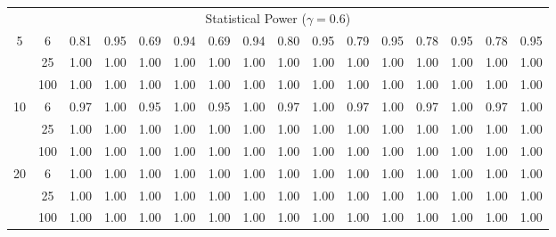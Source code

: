 \documentclass[
  man]{apa6}
\newenvironment{lltable}{\begin{landscape}\centering\begin{ThreePartTable}}{\end{ThreePartTable}\end{landscape}}
\begin{document}
\begin{lltable}
{\begin{longtable}{cccccccccccccccc}
\multicolumn{16}{c}{Statistical Power ($\gamma = 0.6$)}\\
5 & 6 & 0.81 & 0.95 & 0.69 & 0.94 & 0.69 & 0.94 & 0.80 & 0.95 & 0.79 & 0.95 & 0.78 & 0.95 & 0.78 & 0.95\\
 & 25 & 1.00 & 1.00 & 1.00 & 1.00 & 1.00 & 1.00 & 1.00 & 1.00 & 1.00 & 1.00 & 1.00 & 1.00 & 1.00 & 1.00\\
 & 100 & 1.00 & 1.00 & 1.00 & 1.00 & 1.00 & 1.00 & 1.00 & 1.00 & 1.00 & 1.00 & 1.00 & 1.00 & 1.00 & 1.00\\
10 & 6 & 0.97 & 1.00 & 0.95 & 1.00 & 0.95 & 1.00 & 0.97 & 1.00 & 0.97 & 1.00 & 0.97 & 1.00 & 0.97 & 1.00\\
 & 25 & 1.00 & 1.00 & 1.00 & 1.00 & 1.00 & 1.00 & 1.00 & 1.00 & 1.00 & 1.00 & 1.00 & 1.00 & 1.00 & 1.00\\
 & 100 & 1.00 & 1.00 & 1.00 & 1.00 & 1.00 & 1.00 & 1.00 & 1.00 & 1.00 & 1.00 & 1.00 & 1.00 & 1.00 & 1.00\\
20 & 6 & 1.00 & 1.00 & 1.00 & 1.00 & 1.00 & 1.00 & 1.00 & 1.00 & 1.00 & 1.00 & 1.00 & 1.00 & 1.00 & 1.00\\
 & 25 & 1.00 & 1.00 & 1.00 & 1.00 & 1.00 & 1.00 & 1.00 & 1.00 & 1.00 & 1.00 & 1.00 & 1.00 & 1.00 & 1.00\\
 & 100 & 1.00 & 1.00 & 1.00 & 1.00 & 1.00 & 1.00 & 1.00 & 1.00 & 1.00 & 1.00 & 1.00 & 1.00 & 1.00 & 1.00\\
\bottomrule
\end{longtable}

}

\end{lltable}
\end{document}
